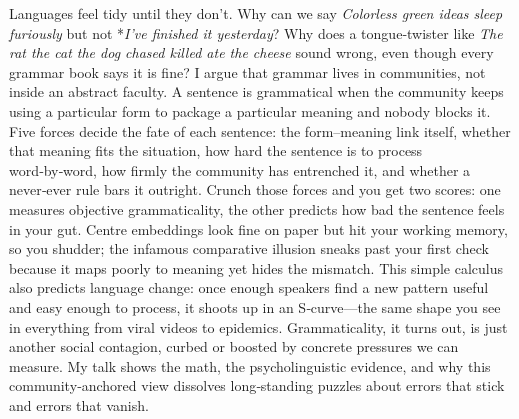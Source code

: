 Languages feel tidy until they don’t. Why can we say \emph{Colorless green ideas sleep furiously} but not *\emph{I’ve finished it yesterday}? Why does a tongue‑twister like \emph{The rat the cat the dog chased killed ate the cheese} sound wrong, even though every grammar book says it is fine? I argue that grammar lives in communities, not inside an abstract faculty. A sentence is grammatical when the community keeps using a particular form to package a particular meaning and nobody blocks it. Five forces decide the fate of each sentence: the form–meaning link itself, whether that meaning fits the situation, how hard the sentence is to process word‑by‑word, how firmly the community has entrenched it, and whether a never‑ever rule bars it outright. Crunch those forces and you get two scores: one measures objective grammaticality, the other predicts how bad the sentence feels in your gut. Centre embeddings look fine on paper but hit your working memory, so you shudder; the infamous comparative illusion sneaks past your first check because it maps poorly to meaning yet hides the mismatch. This simple calculus also predicts language change: once enough speakers find a new pattern useful and easy enough to process, it shoots up in an S‑curve—the same shape you see in everything from viral videos to epidemics. Grammaticality, it turns out, is just another social contagion, curbed or boosted by concrete pressures we can measure. My talk shows the math, the psycholinguistic evidence, and why this community‑anchored view dissolves long‑standing puzzles about errors that stick and errors that vanish.
